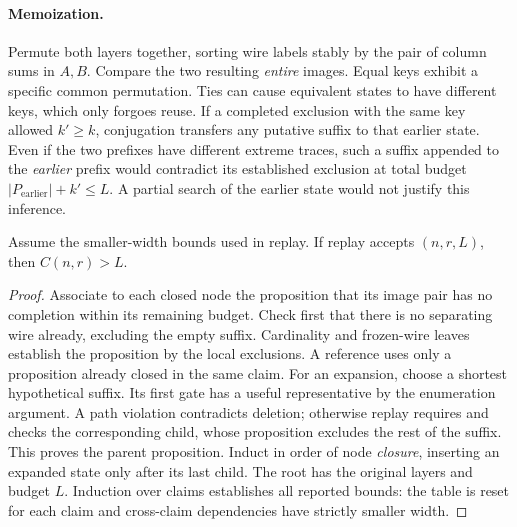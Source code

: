 \paragraph{Memoization.}
Permute both layers together, sorting wire labels stably by the pair of
column sums in $A,B$. Compare the two resulting \emph{entire} images.
Equal keys exhibit a specific common permutation. Ties can cause equivalent
states to have different keys, which only forgoes reuse. If a completed
exclusion with the same key allowed $k'\ge k$, conjugation transfers any
putative suffix to that earlier state. Even if the two prefixes have
different extreme traces, such a suffix appended to the \emph{earlier}
prefix would contradict its established exclusion at total budget
$|P_{\mathrm{earlier}}|+k'\le L$. A partial search of the earlier state
would not justify this inference.

\begin{proposition}\label{prop:replay}
Assume the smaller-width bounds used in replay. If replay accepts
$(n,r,L)$, then $C(n,r)>L$.
\end{proposition}
\begin{proof}
Associate to each closed node the proposition that its image pair has no
completion within its remaining budget. Check first that there is no
separating wire already, excluding the empty suffix. Cardinality and
frozen-wire leaves establish the proposition by the local exclusions.
A reference uses only a proposition already closed in the same claim.
For an expansion, choose a shortest hypothetical suffix. Its first gate
has a useful representative by the enumeration argument. A path violation
contradicts deletion; otherwise replay requires and checks the corresponding
child, whose proposition excludes the rest of the suffix. This proves the
parent proposition. Induct in order of node \emph{closure}, inserting an
expanded state only after its last child. The root has the original layers
and budget $L$. Induction over claims establishes all reported bounds:
the table is reset for each claim and cross-claim dependencies have
strictly smaller width.
\end{proof}

